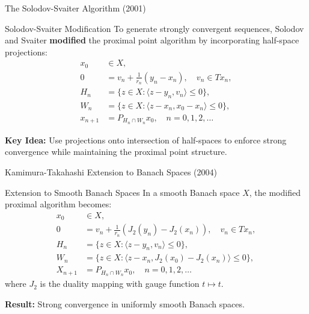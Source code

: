 \documentclass[aspectratio=169,10pt]{beamer}
\begin{document}
\begin{frame}{The Solodov-Svaiter Algorithm (2001)}
    \begin{block}{Solodov-Svaiter Modification}
        To generate strongly convergent sequences, Solodov and Svaiter \textbf{modified}
        the proximal point algorithm by incorporating half-space projections:
        \[
            \boxed{
            \begin{aligned}
                x_0 &\in X, \\
                0 &= v_n + \frac{1}{r_n}(y_n - x_n), \quad v_n \in Tx_n, \\
                H_n &= \{z \in X : \langle z - y_n, v_n \rangle \leq 0\}, \\
                W_n &= \{z \in X : \langle z - x_n, x_0 - x_n \rangle \leq 0\}, \\
                x_{n+1} &= P_{H_n \cap W_n} x_0, \quad n = 0, 1, 2, \ldots
            \end{aligned}
            }
        \]
    \end{block}

    \vspace{0.2cm}
    \textbf{Key Idea:} Use projections onto intersection of half-spaces to enforce
    strong convergence while maintaining the proximal point structure.
\end{frame}

\begin{frame}{Kamimura-Takahashi Extension to Banach Spaces (2004)}
    \begin{block}{Extension to Smooth Banach Spaces}
        In a smooth Banach space $X$, the modified proximal algorithm becomes:
        \[
            \boxed{
            \begin{aligned}
                x_0 &\in X, \\
                0 &= v_n + \frac{1}{r_n}(J_2(y_n) - J_2(x_n)), \quad v_n \in Tx_n, \\
                H_n &= \{z \in X : \langle z - y_n, v_n \rangle \leq 0\}, \\
                W_n &= \{z \in X : \langle z - x_n, J_2(x_0) - J_2(x_n) \rangle \leq 0\}, \\
                X_{n+1} &= P_{H_n \cap W_n} x_0, \quad n = 0, 1, 2, \ldots
            \end{aligned}
            }
        \]
        where $J_2$ is the duality mapping with gauge function $t \mapsto t$.
    \end{block}

    \textbf{Result:} Strong convergence in uniformly smooth Banach spaces.
\end{frame}
\end{document}
